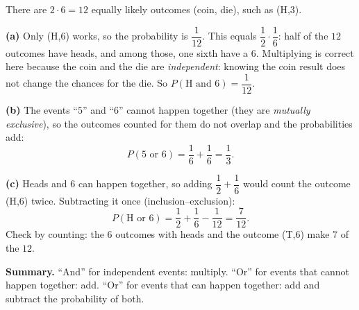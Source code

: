 There are $2\cdot6=12$ equally likely outcomes (coin, die), such as (H,$3$).

\textbf{(a)} Only (H,$6$) works, so the probability is $\dfrac1{12}$. This equals $\dfrac12\cdot\dfrac16$: half of the $12$ outcomes have heads, and among those, one sixth have a $6$. Multiplying is correct here because the coin and the die are \emph{independent}: knowing the coin result does not change the chances for the die. So $P(\text{H and }6)=\boxed{\dfrac1{12}}$.

\textbf{(b)} The events ``$5$'' and ``$6$'' cannot happen together (they are \emph{mutually exclusive}), so the outcomes counted for them do not overlap and the probabilities add:
\[P(5\text{ or }6)=\dfrac16+\dfrac16=\boxed{\dfrac13}.\]

\textbf{(c)} Heads and $6$ can happen together, so adding $\dfrac12+\dfrac16$ would count the outcome (H,$6$) twice. Subtracting it once (inclusion--exclusion):
\[P(\text{H or }6)=\dfrac12+\dfrac16-\dfrac1{12}=\boxed{\dfrac7{12}}.\]
Check by counting: the $6$ outcomes with heads and the outcome (T,$6$) make $7$ of the $12$.

\textbf{Summary.} ``And'' for independent events: multiply. ``Or'' for events that cannot happen together: add. ``Or'' for events that can happen together: add and subtract the probability of both.
